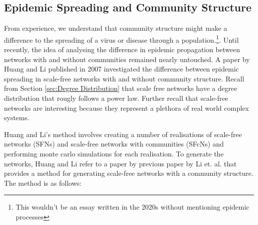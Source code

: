 \subsection{Epidemic Spreading and Community Structure}
From experience, we understand that community structure might make a difference to the spreading of a virus or disease through a population.\footnote{This wouldn't be an essay written in the 2020s without mentioning epidemic processes}. Until recently, the idea of analysing the difference in epidemic propagation between networks with and without communities remained nearly untouched. A paper by Huang and Li published in 2007\cite{Huang_2007} investigated the difference between epidemic spreading in scale-free networks with and without community structure. Recall from Section \ref{sec:Degree Distribution} that scale free networks have a degree distribution that rougly follows a power law. Further recall that scale-free networks are interesting because they represent a plethora of real world complex systems.

Huang and Li's method involves creating a number of realisations of scale-free networks (SFNs) and scale-free networks with communities (SFcNs) and performing monte carlo simulations for each realisation. To generate the networks, Huang and Li refer to a paper by previous paper by Li et. al.\cite{Li_2005} that provides a method for generating scale-free networks with a community structure. The method is as follows:

